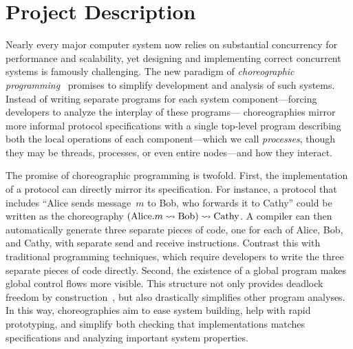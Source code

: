 \maketitle

\section{Project Description}
\label{sec:intro}

Nearly every major computer system now relies on substantial concurrency for performance and scalability,
yet designing and implementing correct concurrent systems is famously challenging.
The new paradigm of \emph{choreographic programming}~\citep{Montesi13,Montesi23} promises to simplify development and analysis of such systems.
Instead of writing separate programs for each system component---forcing developers to analyze the interplay of these programs---%
choreographies mirror more informal protocol specifications with a single top-level program
describing both the local operations of each component---which we call \emph{processes}, though they may be threads, processes, or even entire nodes---and how they interact.

The promise of choreographic programming is twofold.
First, the implementation of a protocol can directly mirror its specification.
For instance, a protocol that includes ``Alice sends message~$m$ to Bob, who forwards it to Cathy''
could be written as the choreography $(\text{Alice}.m \rightsquigarrow \text{Bob}) \rightsquigarrow \text{Cathy}$.
A compiler can then automatically generate three separate pieces of code, one for each of Alice, Bob, and Cathy,
with separate send and receive instructions.
Contrast this with traditional programming techniques, which require developers to write the three separate pieces of code directly.
Second, the existence of a global program makes global control flows more visible.
This structure not only provides deadlock freedom by construction~\cite{CarboneM13}, but also drastically simplifies other program analyses.
In this way, choreographies aim to ease system building, help with rapid prototyping,
and simplify both checking that implementations matches specifications
and analyzing important system properties.

